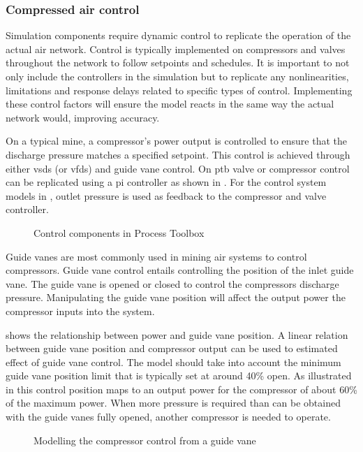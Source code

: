 		\subsubsection{Compressed air control}\label{Controllers}
			Simulation components require dynamic control to replicate the operation of the actual air network. Control is typically implemented on compressors and valves throughout the network to follow setpoints and schedules. It is important to not only include the controllers in the simulation but to replicate any nonlinearities, limitations and response delays related to specific types of control. Implementing these control factors will ensure the model reacts in the same way the actual network would, improving accuracy.
			\par 
			On a typical mine, a compressor's power output is controlled to ensure that the discharge pressure matches a specified setpoint. This control is achieved through either \glspl{vsd} (or \glspl{vfd}) and guide vane control. On \gls{ptb} valve or compressor control can be replicated using a \gls{pi} controller as shown in . For the control system models in , outlet pressure is used as feedback to the compressor and valve controller. 
			\par 
			
	\begin{figure}[h!]
		\centering
		\caption[Control components in Process Toolbox]{Control components in Process Toolbox}
		\label{fig: Controller models}
	\end{figure}
		Guide vanes are most commonly used in mining air systems to control compressors. Guide vane control entails controlling the position of the inlet guide vane. The guide vane is opened or closed to control the compressors discharge pressure. Manipulating the guide vane position will affect the output power the compressor inputs into the system. 
		\par 
		 shows the relationship between power and guide vane position. A linear relation between guide vane position and compressor output can be used to estimated effect of guide vane control. The model should take into account the minimum guide vane position limit that is typically set at around 40\% open. As illustrated in  this control position maps to an output power for the compressor of about 60\% of the maximum power. When more pressure is required than can be obtained with the guide vanes fully opened, another compressor is needed to operate. 
		\begin{figure}[h]
			\centering
			\fbox{}
			\caption{Modelling the compressor control from a guide vane\protect \footnotemark[1]}
			\label{fig: Guide vane position}
		\end{figure}
	
